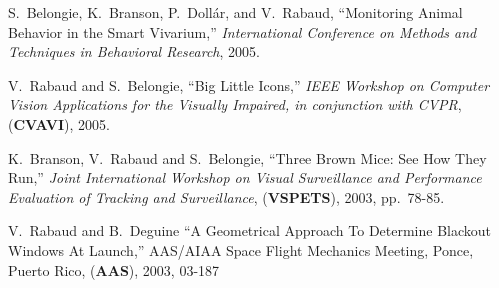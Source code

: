 S.~Belongie, K.~Branson, P.~Doll\'ar, and V.~Rabaud, ``Monitoring Animal Behavior in the Smart Vivarium,'' {\em 
International Conference on Methods and Techniques in Behavioral Research}, 2005.

V.~Rabaud and S.~Belongie, ``Big Little Icons,'' {\em IEEE Workshop on Computer Vision Applications for the Visually 
Impaired, in conjunction with CVPR}, (\textbf{CVAVI}), 2005.

K.\ Branson, V.\ Rabaud and S.\ Belongie, ``Three Brown Mice: See How They Run,''
{\em Joint International Workshop on Visual Surveillance and Performance Evaluation of Tracking and Surveillance}, 
(\textbf{VSPETS}), 2003, pp.\ 78-85. 

V.\ Rabaud and B.\ Deguine ``A Geometrical Approach To Determine Blackout Windows At Launch,''
AAS/AIAA Space Flight Mechanics Meeting, Ponce, Puerto Rico, (\textbf{AAS}), 2003, 03-187 

